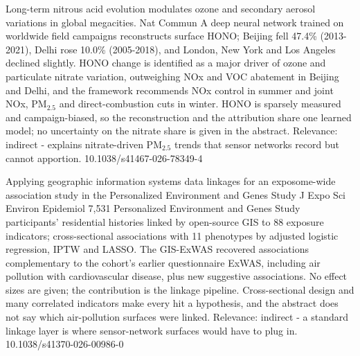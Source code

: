 \documentclass[10pt]{article}
\begin{document}
{Long-term nitrous acid evolution modulates ozone and secondary aerosol variations in global megacities.}
{Nat Commun}
{A deep neural network trained on worldwide field campaigns reconstructs surface HONO; Beijing fell 47.4\% (2013-2021), Delhi rose 10.0\% (2005-2018), and London, New York and Los Angeles declined slightly. HONO change is identified as a major driver of ozone and particulate nitrate variation, outweighing NOx and VOC abatement in Beijing and Delhi, and the framework recommends NOx control in summer and joint NOx, PM$_{2.5}$ and direct-combustion cuts in winter. HONO is sparsely measured and campaign-biased, so the reconstruction and the attribution share one learned model; no uncertainty on the nitrate share is given in the abstract. Relevance: indirect - explains nitrate-driven PM$_{2.5}$ trends that sensor networks record but cannot apportion.}
{10.1038/s41467-026-78349-4}

{Applying geographic information systems data linkages for an exposome-wide association study in the Personalized Environment and Genes Study}
{J Expo Sci Environ Epidemiol}
{7,531 Personalized Environment and Genes Study participants' residential histories linked by open-source GIS to 88 exposure indicators; cross-sectional associations with 11 phenotypes by adjusted logistic regression, IPTW and LASSO. The GIS-ExWAS recovered associations complementary to the cohort's earlier questionnaire ExWAS, including air pollution with cardiovascular disease, plus new suggestive associations. No effect sizes are given; the contribution is the linkage pipeline. Cross-sectional design and many correlated indicators make every hit a hypothesis, and the abstract does not say which air-pollution surfaces were linked. Relevance: indirect - a standard linkage layer is where sensor-network surfaces would have to plug in.}
{10.1038/s41370-026-00986-0}
\end{document}
